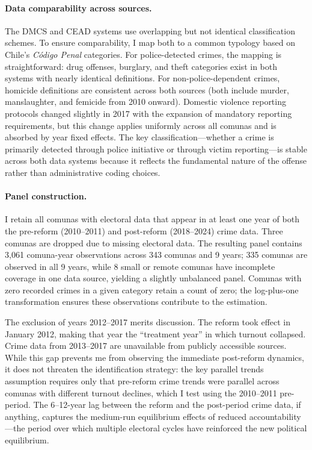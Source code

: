 \documentclass[12pt]{article}
\begin{document}
\paragraph{Data comparability across sources.} The DMCS and CEAD systems use overlapping but not identical classification schemes. To ensure comparability, I map both to a common typology based on Chile's \textit{C\'{o}digo Penal} categories. For police-detected crimes, the mapping is straightforward: drug offenses, burglary, and theft categories exist in both systems with nearly identical definitions. For non-police-dependent crimes, homicide definitions are consistent across both sources (both include murder, manslaughter, and femicide from 2010 onward). Domestic violence reporting protocols changed slightly in 2017 with the expansion of mandatory reporting requirements, but this change applies uniformly across all comunas and is absorbed by year fixed effects. The key classification---whether a crime is primarily detected through police initiative or through victim reporting---is stable across both data systems because it reflects the fundamental nature of the offense rather than administrative coding choices.

\paragraph{Panel construction.} I retain all comunas with electoral data that appear in at least one year of both the pre-reform (2010--2011) and post-reform (2018--2024) crime data. Three comunas are dropped due to missing electoral data. The resulting panel contains 3,061 comuna-year observations across 343 comunas and 9 years; 335 comunas are observed in all 9 years, while 8 small or remote comunas have incomplete coverage in one data source, yielding a slightly unbalanced panel. Comunas with zero recorded crimes in a given category retain a count of zero; the log-plus-one transformation ensures these observations contribute to the estimation.

The exclusion of years 2012--2017 merits discussion. The reform took effect in January 2012, making that year the ``treatment year'' in which turnout collapsed. Crime data from 2013--2017 are unavailable from publicly accessible sources. While this gap prevents me from observing the immediate post-reform dynamics, it does not threaten the identification strategy: the key parallel trends assumption requires only that pre-reform crime trends were parallel across comunas with different turnout declines, which I test using the 2010--2011 pre-period. The 6--12-year lag between the reform and the post-period crime data, if anything, captures the medium-run equilibrium effects of reduced accountability---the period over which multiple electoral cycles have reinforced the new political equilibrium.
\end{document}
